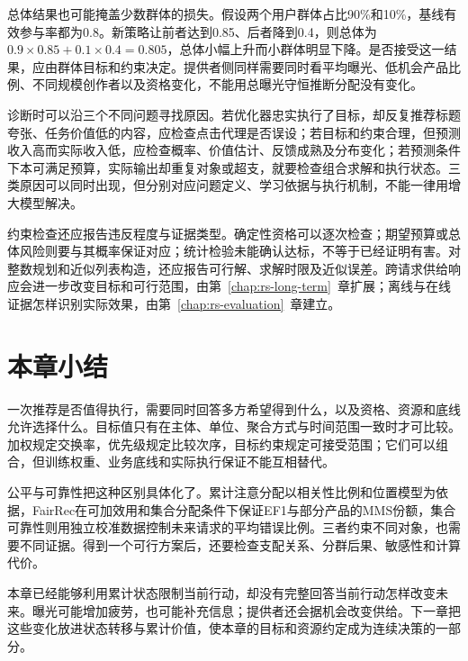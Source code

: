 总体结果也可能掩盖少数群体的损失。假设两个用户群体占比90\%和10\%，基线有效参与率都为0.8。新策略让前者达到0.85、后者降到0.4，则总体为$0.9\times0.85+0.1\times0.4=0.805$，总体小幅上升而小群体明显下降。是否接受这一结果，应由群体目标和约束决定。提供者侧同样需要同时看平均曝光、低机会产品比例、不同规模创作者以及资格变化，不能用总曝光守恒推断分配没有变化。

诊断时可以沿三个不同问题寻找原因。若优化器忠实执行了目标，却反复推荐标题夸张、任务价值低的内容，应检查点击代理是否误设；若目标和约束合理，但预测收入高而实际收入低，应检查概率、价值估计、反馈成熟及分布变化；若预测条件下本可满足预算，实际输出却重复对象或超支，就要检查组合求解和执行状态。三类原因可以同时出现，但分别对应问题定义、学习依据与执行机制，不能一律用增大模型解决。

约束检查还应报告违反程度与证据类型。确定性资格可以逐次检查；期望预算或总体风险则要与其概率保证对应；统计检验未能确认达标，不等于已经证明有害。对整数规划和近似列表构造，还应报告可行解、求解时限及近似误差。跨请求供给响应会进一步改变目标和可行范围，由第~\ref{chap:rs-long-term}~章扩展；离线与在线证据怎样识别实际效果，由第~\ref{chap:rs-evaluation}~章建立。

\section{本章小结}
\label{sec:rs-constraints-summary}

一次推荐是否值得执行，需要同时回答多方希望得到什么，以及资格、资源和底线允许选择什么。目标值只有在主体、单位、聚合方式与时间范围一致时才可比较。加权规定交换率，优先级规定比较次序，目标约束规定可接受范围；它们可以组合，但训练权重、业务底线和实际执行保证不能互相替代。

公平与可靠性把这种区别具体化了。累计注意分配以相关性比例和位置模型为依据，FairRec在可加效用和集合分配条件下保证EF1与部分产品的MMS份额，集合可靠性则用独立校准数据控制未来请求的平均错误比例。三者约束不同对象，也需要不同证据。得到一个可行方案后，还要检查支配关系、分群后果、敏感性和计算代价。

本章已经能够利用累计状态限制当前行动，却没有完整回答当前行动怎样改变未来。曝光可能增加疲劳，也可能补充信息；提供者还会据机会改变供给。下一章把这些变化放进状态转移与累计价值，使本章的目标和资源约定成为连续决策的一部分。
